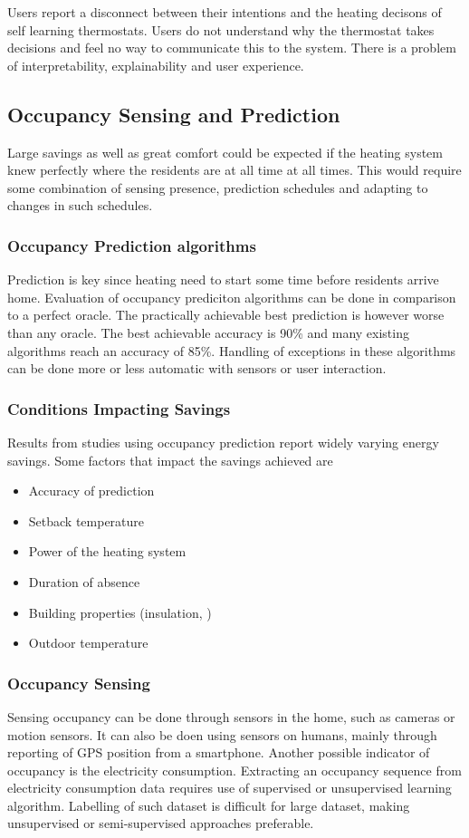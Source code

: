 Users report a disconnect between their intentions and the heating decisons of self learning thermostats.
Users do not understand why the thermostat takes decisions and feel no way to communicate this to the system.
There is a problem of interpretability, explainability and user experience.

\subsection{Occupancy Sensing and Prediction}
Large savings as well as great comfort could be expected if the heating system knew perfectly where the residents are at all time at all times. This would require some combination of sensing presence, prediction schedules and adapting to changes in such schedules.

\subsubsection{Occupancy Prediction algorithms}
Prediction is key since heating need to start some time before residents arrive home.
Evaluation of occupancy prediciton algorithms can be done in comparison to a perfect oracle.
The practically achievable best prediction is however worse than any oracle.
The best achievable accuracy is 90\% and many existing algorithms reach an accuracy of 85\%.
Handling of exceptions in these algorithms can be done more or less automatic with sensors or user interaction.

\subsubsection{Conditions Impacting Savings}
Results from studies using occupancy prediction report widely varying energy savings.
Some factors that impact the savings achieved are

\begin{itemize}
    \item Accuracy of prediction
    \item Setback temperature
    \item Power of the heating system
    \item Duration of absence
    \item Building properties (insulation, )
    \item Outdoor temperature
\end{itemize}

\subsubsection{Occupancy Sensing}
Sensing occupancy can be done through sensors in the home, such as cameras or motion sensors.
It can also be doen using sensors on humans, mainly through reporting of GPS position from a smartphone.
Another possible indicator of occupancy is the electricity consumption.
Extracting an occupancy sequence from electricity consumption data requires use of supervised or unsupervised learning algorithm.
Labelling of such dataset is difficult for large dataset, making unsupervised or semi-supervised approaches preferable.


